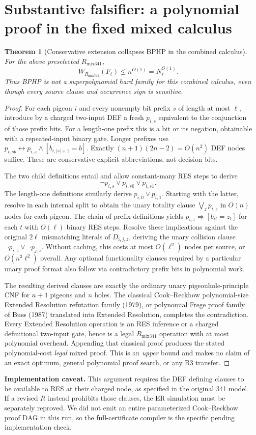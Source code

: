 \documentclass[11pt]{article}
\newtheorem{theorem}{Theorem}
\begin{document}
\section{Substantive falsifier: a polynomial proof in the fixed mixed calculus}
\begin{theorem}[Conservative extension collapses BPHP in the combined calculus]
For the above \emph{preselected} $R_{\mathrm{mix341}}$,
\[
W_{R_{\mathrm{mix341}}}(F_\ell)\le n^{O(1)}=N_\ell^{O(1)}.
\]
Thus BPHP is not a superpolynomial hard family for this combined calculus, even though every source clause and occurrence sign is sensitive.
\end{theorem}
\begin{proof}
For each pigeon $i$ and every nonempty bit prefix $s$ of length at most $\ell$, introduce by a charged two-input DEF a fresh $p_{i,s}$ equivalent to the conjunction of those prefix bits. For a length-one prefix this is a bit or its negation, obtainable with a repeated-input binary gate. Longer prefixes use $p_{i,sb}\leftrightarrow p_{i,s}\wedge[b_{i,|s|+1}=b]$. Exactly $(n+1)(2n-2)=O(n^2)$ DEF nodes suffice. These are conservative explicit abbreviations, not decision bits.

The two child definitions entail and allow constant-many RES steps to derive
\[
\neg p_{i,s}\vee p_{i,s0}\vee p_{i,s1}.
\]
The length-one definitions similarly derive $p_{i,0}\vee p_{i,1}$. Starting with the latter, resolve in each internal split to obtain the unary totality clause $\bigvee_{z}p_{i,z}$ in $O(n)$ nodes for each pigeon. The chain of prefix definitions yields $p_{i,z}\Rightarrow[b_{it}=z_t]$ for each $t$ with $O(\ell)$ binary RES steps. Resolve these implications against the original $2\ell$ mismatching literals of $D_{i,j,z}$, deriving the unary collision clause $\neg p_{i,z}\vee\neg p_{j,z}$. Without caching, this costs at most $O(\ell^2)$ nodes per source, or $O(n^3\ell^2)$ overall. Any optional functionality clauses required by a particular unary proof format also follow via contradictory prefix bits in polynomial work.

The resulting derived clauses are exactly the ordinary unary pigeonhole-principle CNF for $n+1$ pigeons and $n$ holes. The classical Cook--Reckhow polynomial-size Extended Resolution refutation family (1979), or polynomial Frege proof family of Buss (1987) translated into Extended Resolution, completes the contradiction. Every Extended Resolution operation is an RES inference or a charged definitional two-input gate, hence is a legal $R_{\mathrm{mix341}}$ operation with at most polynomial overhead. Appending that classical proof produces the stated polynomial-cost \emph{legal} mixed proof. This is an \emph{upper} bound and makes no claim of an exact optimum, general polynomial proof search, or any B3 transfer.
\end{proof}
\noindent\textbf{Implementation caveat.} This argument requires the DEF defining clauses to be available to RES at their charged node, as specified in the original 341 model. If a revised $R$ instead prohibits those clauses, the ER simulation must be separately reproved. We did not emit an entire parameterized Cook--Reckhow proof DAG in this run, so the full-certificate compiler is the specific pending implementation check.
\end{document}
